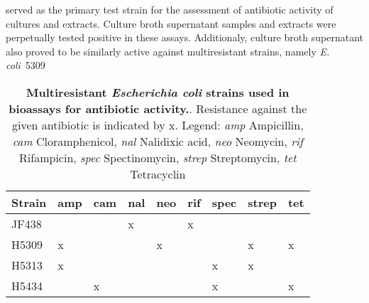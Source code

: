 \coli{} served as the primary test strain for the assessment of antibiotic activity of \tue{} cultures and extracts.
Culture broth supernatant samples and extracts were perpetually tested positive in these assays.
Additionaly, culture broth supernatant also proved to be similarly active against multiresistant strains, namely \emph{E. coli}~5309 

\begin{table}[htbp]
\caption[Multiresistant \emph{Escherichia coli} strains used in bioassays for antibiotic activity.]{%
	\textbf{Multiresistant \emph{Escherichia coli} strains used in bioassays for antibiotic activity.}.
    Resistance against the given antibiotic is indicated by x.
    Legend:
    \emph{amp} Ampicillin,
    \emph{cam} Cloramphenicol,
    \emph{nal} Nalidixic acid,
    \emph{neo} Neomycin,
    \emph{rif} Rifampicin,
    \emph{spec} Spectinomycin,
    \emph{strep} Streptomycin,
    \emph{tet} Tetracyclin
}
\label{tab:resistant_colis}
\centering
\begin{tabularx}{\textwidth}{XXXXXXXXX}
    \toprule
    Strain 	& amp 	& cam 	& nal 	& neo 	& rif 	& spec 	& strep 	& tet 	\\
    \midrule
    JF438 	&		&		& x		&		& x		& 		&			&		\\
    H5309	& x		& 		&		& x		&		&		& x			& x		\\
    H5313 	& x		&		&		&		&		& x		& x			&  		\\
    H5434 	& 		& x		& 		&		&		& x		&			& x 	\\
    \bottomrule
\end{tabularx}
\end{table}


